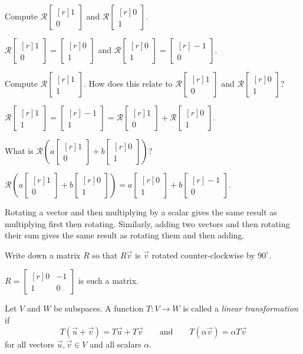 \documentclass{problemset}
\newcommand{\mat}[1]{\begin{bmatrix*}[r]#1\end{bmatrix*}}
\begin{document}
	\begin{parts}
		\item Compute $\mathcal R\mat{1\\0}$ and $\mathcal R\mat{0\\1}$.
			\begin{solution}[inline]
				$\mathcal R\mat{1\\0}=\mat{0\\1}$ and
				$\mathcal R\mat{0\\1}=\mat{-1\\0}$.
			\end{solution}
		\item Compute $\mathcal R\mat{1\\1}$. How does this relate to
			$\mathcal R\mat{1\\0}$ and $\mathcal R\mat{0\\1}$?
			\begin{solution}
				$\mathcal R\mat{1\\1}=\mat{-1\\1}=\mathcal R\mat{1\\0}+\mathcal R\mat{0\\1}$.
			\end{solution}
		\item What is $\mathcal R\left(a\mat{1\\0}+b\mat{0\\1}\right)$?
			\begin{solution}
				$\mathcal R\left(a\mat{1\\0}+b\mat{0\\1}\right)=a\mat{0\\1}+b\mat{-1\\0}$.

				Rotating a vector and then multiplying by a scalar gives the same
				result as multiplying first then rotating. Similarly, adding two
				vectors and then rotating their sum gives the same result as rotating
				them and then adding.
			\end{solution}
		\item Write down a matrix $R$ so that $R\vec v$ is $\vec v$ rotated
			counter-clockwise by $90^\circ$.
			\begin{solution}
				$R = \mat{0&-1\\1&0}$ is such a matrix.
			\end{solution}
	\end{parts}

	\begin{definition}
		Let $V$ and $W$ be subspaces. A function $T:V\to W$ is called a \emph{linear transformation}
		if
		\[
			T(\vec u+\vec v)=T\vec u+T\vec v \qquad\text{and}\qquad
			T(\alpha \vec v)=\alpha T\vec v
		\]
		for all vectors $\vec u,\vec v\in V$ and all scalars $\alpha$.
	\end{definition}
\end{document}

